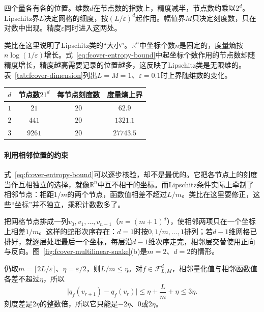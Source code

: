 四个量各有各的位置。维数$d$在节点数的指数上，精度减半，节点数约乘以$2^d$。Lipschitz界$L$决定网格的细度，按$(L/\varepsilon)^d$起作用。幅值界$M$只决定刻度数，只在对数中出现。精度$\varepsilon$同时进入这两处。

类比在这里说明了Lipschitz类的“大小”。$\mathbb R^n$中坐标个数$n$是固定的，度量熵按$n\log(1/\varepsilon)$增长。式~\eqref{eq:fcover-entropy-bound}中起坐标个数作用的节点数却随精度增长，精度越高需要记录的位置越多，这反映了Lipschitz类是无限维的。表~\ref{tab:fcover-dimension}列出$L=M=1$、$\varepsilon=0.1$时上界随维数的变化。

\begin{BookInlineTable}
  \centering
  \begin{tabular}{@{}cccc@{}}
    \toprule
    $d$ & 节点数$21^d$ & 每节点刻度数 & 度量熵上界\\
    \midrule
    $1$ & $21$ & $20$ & $62.9$\\
    $2$ & $441$ & $20$ & $1321.1$\\
    $3$ & $9261$ & $20$ & $27743.5$\\
    \bottomrule
  \end{tabular}
  \caption{$L=M=1$、$\varepsilon=0.1$时式~\eqref{eq:fcover-entropy-bound}的各项。每个节点的刻度数都是$20$，节点数按$21^d$增长，度量熵上界（自然对数）随之按同一比例增长。}
  \label{tab:fcover-dimension}
\end{BookInlineTable}

\paragraph{利用相邻位置的约束}

式~\eqref{eq:fcover-entropy-bound}可以逐步核验，却不是最优的。它把各节点上的刻度当作互相独立的选择，就像$\mathbb R^n$中互不相干的坐标。而Lipschitz条件实际上牵制了相邻节点：相距$1/m$的两个节点，函数值相差不超过$L/m$。类比在这里要修正，这些“坐标”并不独立，乘积计数数多了。

把网格节点排成一列$v_0,v_1,\ldots,v_{n-1}$（$n=(m+1)^d$），使相邻两项只在一个坐标上相差$1/m$。这样的蛇形次序存在：$d=1$时按$0,1/m,\ldots,1$排列；若$d-1$维网格已排好，就逐层处理最后一个坐标，每层沿$d-1$维次序走完，相邻层交替使用正向与反向。图~\ref{fig:fcover-multilinear-snake}(b)是$m=2$、$d=2$的情形。

仍取$m=\lceil2L/\varepsilon\rceil$、$\eta=\varepsilon/2$，则$L/m\leq\eta$。对$f\in\mathcal F^d_{L,M}$，相邻量化值与相邻函数值各差不超过$\eta$，所以
\[
 \lvert q_f(v_{r+1})-q_f(v_r)\rvert\leq\eta+\frac Lm+\eta\leq3\eta .
\]
刻度差是$2\eta$的整数倍，所以它只能是$-2\eta$、$0$或$2\eta$。

